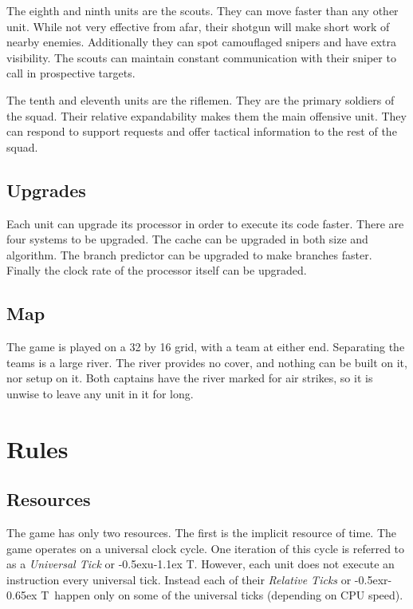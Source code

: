 \documentclass{article}
\newcommand{\UT}{\lower-0.5ex\hbox{u}\kern-1.1ex T}
\newcommand{\RT}{\lower-0.5ex\hbox{r}\kern-0.65ex T}
\begin{document}
The eighth and ninth units are the scouts. They can move faster than any other
unit. While not very effective from afar, their shotgun will make short work of
nearby enemies. Additionally they can spot camouflaged snipers and have extra
visibility. The scouts can maintain constant communication with their sniper to
call in prospective targets.

The tenth and eleventh units are the riflemen. They are the primary soldiers of
the squad. Their relative expandability makes them the main offensive unit. They
can respond to support requests and offer tactical information to the rest of
the squad.

\subsection{Upgrades}

Each unit can upgrade its processor in order to execute its code faster. There
are four systems to be upgraded. The cache can be upgraded in both size and
algorithm. The branch predictor can be upgraded to make branches faster. Finally
the clock rate of the processor itself can be upgraded.

\subsection{Map}

The game is played on a 32 by 16 grid, with a team at either end. Separating the
teams is a large river. The river provides no cover, and nothing can be built on
it, nor setup on it. Both captains have the river marked for air strikes, so it
is unwise to leave any unit in it for long.

\clearpage

\section{Rules}

\subsection{Resources}

The game has only two resources. The first is the implicit resource of time. The
game operates on a universal clock cycle. One iteration of this cycle is
referred to as a \textit{Universal Tick} or \UT. However, each unit does not
execute an instruction every universal tick. Instead each of their
\textit{Relative Ticks} or \RT\ happen only on some of the universal ticks
(depending on CPU speed).
\end{document}
